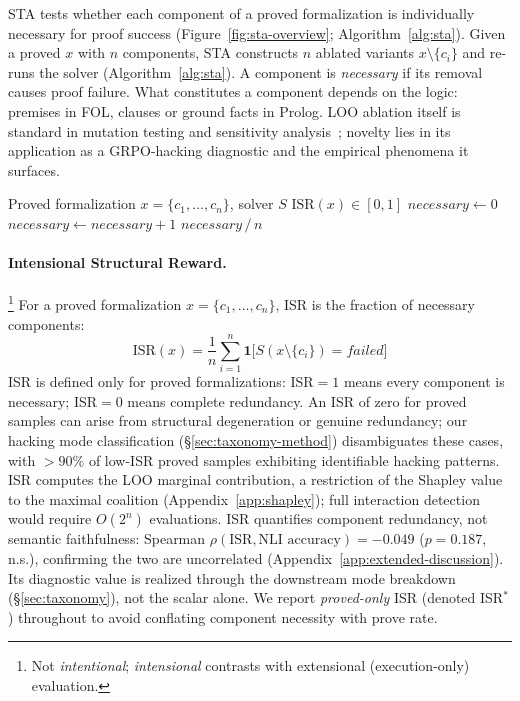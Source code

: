 STA tests whether each component of a proved formalization is individually necessary for proof success (Figure~\ref{fig:sta-overview}; Algorithm~\ref{alg:sta}).
Given a proved $x$ with $n$ components, STA constructs $n$ ablated variants $x\setminus\{c_i\}$ and re-runs the solver (Algorithm~\ref{alg:sta}).
A component is \emph{necessary} if its removal causes proof failure.
What constitutes a component depends on the logic: premises in FOL, clauses or ground facts in Prolog.
LOO ablation itself is standard in mutation testing and sensitivity analysis~\citep{demillo1978, jia-harman-survey}; novelty lies in its application as a GRPO-hacking diagnostic and the empirical phenomena it surfaces.

\begin{algorithm}[t]
\small
\caption{Solver Trace Ablation (STA)}
\label{alg:sta}
\begin{algorithmic}[1]
\REQUIRE Proved formalization $x = \{c_1, \ldots, c_n\}$, solver $S$
\ENSURE $\text{ISR}(x) \in [0, 1]$
\STATE $\textit{necessary} \gets 0$
        \STATE $\textit{necessary} \gets \textit{necessary} + 1$
    \ENDIF
\ENDFOR
\RETURN $\textit{necessary} \,/\, n$
\end{algorithmic}
\end{algorithm}

\paragraph{Intensional Structural Reward.}\footnote{Not \emph{intentional}; \emph{intensional} contrasts with extensional (execution-only) evaluation.}
For a proved formalization $x = \{c_1, \ldots, c_n\}$, ISR is the fraction of necessary components:
\begin{equation}
  \text{ISR}(x) = \frac{1}{n}\sum_{i=1}^{n}\mathbf{1}\bigl[S(x\setminus\{c_i\})=\textit{failed}\bigr]
  \label{eq:isr}
\end{equation}
ISR is defined only for proved formalizations: ISR${=}1$ means every component is necessary; ISR${=}0$ means complete redundancy.
An ISR of zero for proved samples can arise from structural degeneration or genuine redundancy; our hacking mode classification (\S\ref{sec:taxonomy-method}) disambiguates these cases, with ${>}90\%$ of low-ISR proved samples exhibiting identifiable hacking patterns.
ISR computes the LOO marginal contribution, a restriction of the Shapley value to the maximal coalition (Appendix~\ref{app:shapley}); full interaction detection would require $O(2^n)$ evaluations.
ISR quantifies component redundancy, not semantic faithfulness: Spearman $\rho(\text{ISR}, \text{NLI accuracy}) = -0.049$ ($p{=}0.187$, n.s.), confirming the two are uncorrelated (Appendix~\ref{app:extended-discussion}).
Its diagnostic value is realized through the downstream mode breakdown (\S\ref{sec:taxonomy}), not the scalar alone.
We report \emph{proved-only} ISR (denoted ISR$^*$) throughout to avoid conflating component necessity with prove rate.

